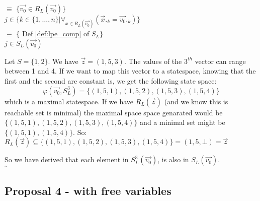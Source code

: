 \index{}\documentclass[a4paper,10pt]{article}
\theoremstyle{plain}
\theoremstyle{definition}
\newcommand{\ovr}{\overrightarrow}
\newcommand{\sq}{$\square$}
\begin{document}
\begin{itemize}
\tmp $ \equiv$ \hspace{20pt} $\lbrace \ovr{v_0}  \in R_L(\ovr{v_0}) \rbrace$\\
\tmp $ j \in \lbrace k \in \lbrace 1, \ldots, n \rbrace \vert \forall_{x \in R_L(\ovr{v_0})}(\ovr{x}._k = \ovr{v_0}._k) \rbrace$\\
\tmp $ \equiv$ \hspace{20pt} $\lbrace$ Def \ref{def:lpe_comp} of $S_L\rbrace$\\
\tmp $ j \in S_L(\ovr{v_0})$

\begin{example}\label{example:proof3}
Let $S = \lbrace 1, 2 \rbrace$.
We have $\ovr{z} = (1, 5, 3)$. 
The values of the $3^{th}$ vector can range between 1 and 4.
If we want to map this vector to a statespace, knowing that the first and the second are
constant is, we get the following state space: 
$$  \varphi(\ovr{v_0},S_L^3) = \lbrace (1, 5, 1), (1, 5, 2), (1, 5, 3), (1, 5, 4) \rbrace$$
which is a maximal statespace. 
If we have $R_L(\ovr{z})$ (and we know this is reachable set is minimal) the maximal space space genarated would be 
$\lbrace (1, 5, 1), (1, 5, 2), (1, 5, 3), (1, 5, 4) \rbrace$ and a minimal set might be $\lbrace (1, 5, 1), (1, 5, 4) \rbrace$. 
So:
$R_L(\ovr{z}) \subseteq \lbrace (1, 5, 1), (1, 5, 2), (1, 5, 3), (1, 5, 4) \rbrace =  (1, 5, \bot) = \ovr{z} $\\
\end{example}

\end{itemize}
So we have derived that each element in $S_L^3(\ovr{v_0})$, is also in $S_L(\ovr{v_0})$.
\\ \sq


\newpage
\subsection{Proposal 4 - with free variables}
\end{document}
